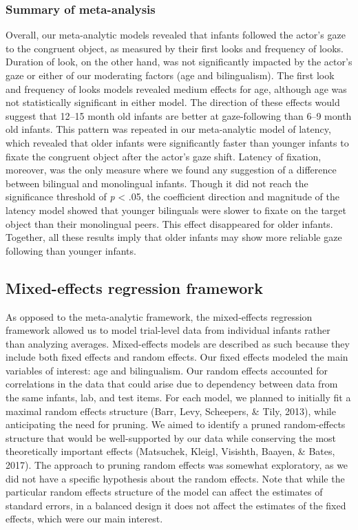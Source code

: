 \documentclass[,man,floatsintext]{apa6}
\begin{document}
\hypertarget{summary-of-meta-analysis}{%
\subsubsection{Summary of meta-analysis}\label{summary-of-meta-analysis}}

Overall, our meta-analytic models revealed that infants followed the actor's gaze to the congruent object, as measured by their first looks and frequency of looks. Duration of look, on the other hand, was not significantly impacted by the actor's gaze or either of our moderating factors (age and bilingualism). The first look and frequency of looks models revealed medium effects for age, although age was not statistically significant in either model. The direction of these effects would suggest that 12--15 month old infants are better at gaze-following than 6--9 month old infants. This pattern was repeated in our meta-analytic model of latency, which revealed that older infants were significantly faster than younger infants to fixate the congruent object after the actor's gaze shift. Latency of fixation, moreover, was the only measure where we found any suggestion of a difference between bilingual and monolingual infants. Though it did not reach the significance threshold of \emph{p} \textless{} .05, the coefficient direction and magnitude of the latency model showed that younger bilinguals were slower to fixate on the target object than their monolingual peers. This effect disappeared for older infants. Together, all these results imply that older infants may show more reliable gaze following than younger infants.

\hypertarget{mixed-effects-regression-framework}{%
\subsection{Mixed-effects regression framework}\label{mixed-effects-regression-framework}}

As opposed to the meta-analytic framework, the mixed-effects regression framework allowed us to model trial-level data from individual infants rather than analyzing averages. Mixed-effects models are described as such because they include both fixed effects and random effects. Our fixed effects modeled the main variables of interest: age and bilingualism. Our random effects accounted for correlations in the data that could arise due to dependency between data from the same infants, lab, and test items. For each model, we planned to initially fit a maximal random effects structure (Barr, Levy, Scheepers, \& Tily, 2013), while anticipating the need for pruning. We aimed to identify a pruned random-effects structure that would be well-supported by our data while conserving the most theoretically important effects (Matsuchek, Kleigl, Visishth, Baayen, \& Bates, 2017). The approach to pruning random effects was somewhat exploratory, as we did not have a specific hypothesis about the random effects. Note that while the particular random effects structure of the model can affect the estimates of standard errors, in a balanced design it does not affect the estimates of the fixed effects, which were our main interest.
\end{document}
